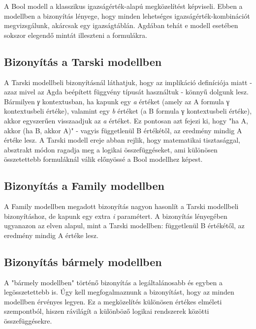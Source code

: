 A Bool modell a klasszikus igazságérték-alapú megközelítést képviseli. Ebben a modellben a bizonyítás lényege, hogy minden lehetséges igazságérték-kombinációt megvizsgálunk, akárcsak egy igazságtáblán. Agdában tehát e modell esetében sokszor elegendő mintát illeszteni a formulákra.

\pBooE

\subsection{Bizonyítás a Tarski modellben}

A Tarski modellbeli bizonyításnál láthatjuk, hogy az implikáció definíciója miatt - azaz mivel az Agda beépített függvény típusát használtuk - könnyű dolgunk lesz. Bármilyen \textit{γ} kontextusban, ha kapunk egy \textit{a} értéket (amely az A formula γ kontextusbeli értéke), valamint egy \textit{b} értéket (a B formula γ kontextusbeli értéke), akkor egyszerűen visszaadjuk az \textit{a} értéket. Ez pontosan azt fejezi ki, hogy "ha A, akkor (ha B, akkor A)" - vagyis függetlenül B értékétől, az eredmény mindig A értéke lesz. A Tarski modell ereje abban rejlik, hogy matematikai tisztasággal, absztrakt módon ragadja meg a logikai összefüggéseket, ami különösen összetettebb formuláknál válik előnyössé a Bool modellhez képest.

\pTarE

\subsection{Bizonyítás a Family modellben}

A Family modellben megadott bizonyítás nagyon hasonlít a Tarski modellbeli bizonyításhoz, de kapunk egy extra \textit{i} paramétert. A bizonyítás lényegében ugyanazon az elven alapul, mint a Tarski modellben: függetlenül B értékétől, az eredmény mindig A értéke lesz.

\pFamE

\subsection{Bizonyítás bármely modellben}

A "bármely modellben" történő bizonyítás a legáltalánosabb és egyben a legösszetettebb is. Úgy kell megfogalmaznunk a bizonyítást, hogy az minden modellben érvényes legyen. Ez a megközelítés különösen értékes elméleti szempontból, hiszen rávilágít a különböző logikai rendszerek közötti összefüggésekre.

